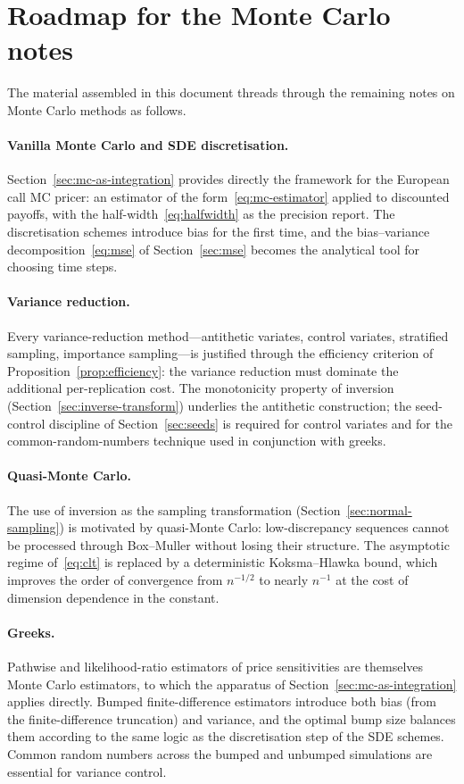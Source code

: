 \documentclass[11pt,a4paper]{article}
\theoremstyle{plain}
\theoremstyle{definition}
\theoremstyle{remark}
\begin{document}
\section{Roadmap for the Monte Carlo notes}
\label{sec:roadmap}

The material assembled in this document threads through the remaining
notes on Monte Carlo methods as follows.

\paragraph{Vanilla Monte Carlo and SDE discretisation.}
Section~\ref{sec:mc-as-integration} provides directly the framework for
the European call MC pricer: an estimator of the
form~\eqref{eq:mc-estimator} applied to discounted payoffs, with the
half-width~\eqref{eq:halfwidth} as the precision report. The
discretisation schemes introduce bias for the first time,
and the bias--variance decomposition~\eqref{eq:mse} of
Section~\ref{sec:mse} becomes the analytical tool for choosing time
steps.

\paragraph{Variance reduction.} Every variance-reduction
method---antithetic variates, control variates, stratified
sampling, importance sampling---is justified through the efficiency
criterion of Proposition~\ref{prop:efficiency}: the variance reduction
must dominate the additional per-replication cost. The monotonicity
property of inversion (Section~\ref{sec:inverse-transform}) underlies
the antithetic construction; the seed-control discipline of
Section~\ref{sec:seeds} is required for control variates and for the
common-random-numbers technique used in conjunction with greeks.

\paragraph{Quasi-Monte Carlo.} The use of inversion as the sampling
transformation (Section~\ref{sec:normal-sampling}) is motivated by
quasi-Monte Carlo: low-discrepancy sequences cannot be processed through
Box--Muller without losing their structure. The asymptotic regime
of~\eqref{eq:clt} is replaced by a deterministic Koksma--Hlawka bound,
which improves the order of convergence from $n^{-1/2}$ to nearly
$n^{-1}$ at the cost of dimension dependence in the constant.

\paragraph{Greeks.} Pathwise and likelihood-ratio estimators
of price sensitivities are themselves Monte Carlo estimators, to which
the apparatus of Section~\ref{sec:mc-as-integration} applies directly.
Bumped finite-difference estimators introduce both bias (from the
finite-difference truncation) and variance, and the optimal bump size
balances them according to the same logic as the discretisation step
of the SDE schemes. Common random numbers across the bumped and unbumped
simulations are essential for variance control.
\end{document}
